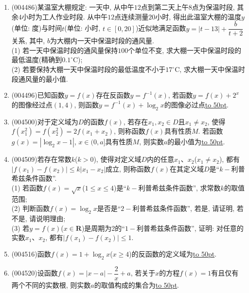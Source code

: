 \documentclass[10pt,a4paper]{article}
\newcommand{\blank}[1]{\underline{\hbox to #1pt{}}}
\begin{document}
\begin{enumerate}[1.]
\begin{center}
\end{center}
\item {\tiny (004486)}某温室大棚规定: 一天中, 从中午$12$点到第二天上午$8$点为保温时段, 其余$4$小时为工人作业时段. 从中午$12$点连续测量$20$小时, 得出此温室大棚的温度$y$(单位: 度)与时间$t$(单位: 小时, $t\in [0,20]$)近似地满足函数$y=|t-13|+\dfrac b{t+2}$关系, 其中, $b$为大棚内一天中保温时段的通风量.\\
(1) 若一天中保温时段的通风量保持$100$个单位不变, 求大棚一天中保温时段的最低温度(精确到$0.1^\circ\text{C}$);\\
(2) 若要保持大棚一天中保温时段的最低温度不小于$17^\circ\text{C}$, 求大棚一天中保温时段通风量的最小值.
\item {\tiny (004496)}已知函数$y=f(x)$存在反函数$y=f^{-1}(x)$, 若函数$y=f(x)+2^x$的图像经过点$(1,4)$, 则函数$y=f^{-1}(x)+\log_2x$的图像必过点\blank{50}.
\item {\tiny (004500)}对于定义域为$D$的函数$f(x)$, 若存在$x_1,x_2\in D$且$x_1\ne x_2$, 使得$f(x_1^2)=f(x_2^2)=2f(x_1+x_2)$, 则称函数$f(x)$具有性质$M$. 若函数$g(x)=|\log_2x-1|$, $x\in (0,a]$具有性质$M$, 则实数$a$的最小值为\blank{50}.
\item {\tiny (004509)}若存在常数$k$($k>0$), 使得对定义域$D$内的任意$x_1$、$x_2$($x_1\ne x_2$), 都有$|f(x_1)-f(x_2)|\le k|x_1-x_2|$成立, 则称函数$f(x)$在其定义域$D$是``$k-$利普希兹条件函数''.\\
(1) 若函数$f(x)=\sqrt x$($1\le x\le 4$)是``$k-$利普希兹条件函数'', 求常数$k$的取值范围;\\
(2) 判断函数$f(x)=\log_2x$是否是``$2-$利普希兹条件函数'', 若是, 请证明, 若不是, 请说明理由;\\
(3) 若$y=f(x)$($x\in \mathbf{R}$)是周期为2的``$1-$利普希兹条件函数'', 证明: 对任意的实数$x_1$、$x_2$, 都有$|f(x_1)-f(x_2)|\le 1$.
\item {\tiny (004516)}函数$f(x)=1+\log_2x$($x\ge 4$)的反函数的定义域为\blank{50}.
\item {\tiny (004520)}设函数$f(x)=|x-a|-\dfrac 2x+a$, 若关于$x$的方程$f(x)=1$有且仅有两个不同的实数根, 则实数$a$的取值构成的集合为\blank{50}.

\end{enumerate}
\end{document}
